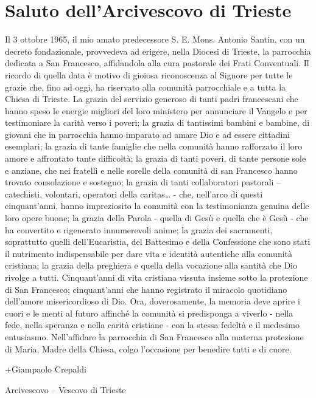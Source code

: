 \chapter*{Saluto dell’Arcivescovo di Trieste}
Il 3 ottobre 1965, il mio amato predecessore S. E. Mons. Antonio Santin, con un decreto  
fondazionale, provvedeva ad erigere, nella Diocesi di Trieste, la parrocchia dedicata a San 
Francesco, affidandola alla cura pastorale dei Frati Conventuali. Il ricordo di quella data è motivo di 
gioiosa riconoscenza al Signore per tutte le grazie che, fino ad oggi, ha riservato alla comunità 
parrocchiale e a tutta la Chiesa di Trieste. La grazia del servizio generoso di tanti padri francescani 
che hanno speso le energie migliori del loro ministero per annunciare il Vangelo e per testimoniare 
la carità verso i poveri; la grazia di tantissimi bambini e bambine, di giovani che in parrocchia 
hanno imparato ad amare Dio e ad essere cittadini esemplari; la grazia di tante famiglie che nella 
comunità hanno rafforzato il loro amore e affrontato tante difficoltà; la grazia di tanti poveri, di 
tante persone sole e anziane, che nei fratelli e nelle sorelle della comunità di  san Francesco  hanno 
trovato consolazione e sostegno; la grazia di tanti collaboratori pastorali – catechisti, volontari, 
operatori della caritas… - che, nell’arco di questi cinquant’anni, hanno impreziosito la comunità 
con la testimonianza genuina delle loro opere buone; la grazia della Parola - quella di Gesù e quella 
che è Gesù - che ha convertito e rigenerato innumerevoli anime; la grazia dei sacramenti, soprattutto 
quelli dell’Eucaristia, del Battesimo e della Confessione che sono stati il nutrimento indispensabile 
per dare vita e identità autentiche alla comunità cristiana; la grazia della preghiera e quella della 
vocazione alla santità che Dio rivolge a tutti.
Cinquant’anni di vita cristiana vissuta insieme sotto la protezione di San Francesco; 
cinquant’anni che hanno registrato il miracolo quotidiano dell’amore misericordioso di Dio. Ora, 
doverosamente, la memoria deve aprire i cuori e le menti al futuro affinché la comunità si 
predisponga a viverlo - nella fede, nella speranza e nella carità cristiane - con la stessa fedeltà e il 
medesimo entusiasmo.
Nell’affidare la parrocchia di San Francesco alla materna protezione di Maria, Madre della 
Chiesa, colgo l’occasione per benedire tutti e di cuore.
\begin{flushright}
+Giampaolo Crepaldi\par
Arcivescovo – Vescovo di Trieste
\end{flushright}
